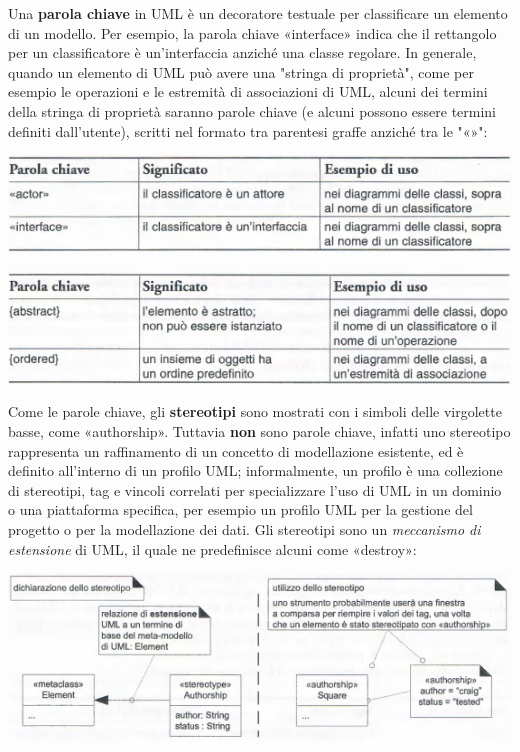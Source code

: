 \documentclass[a4paper,12pt, oneside]{book}
\begin{document}
Una \textbf{parola chiave} in UML è un decoratore testuale per classificare un elemento di un
modello. Per esempio, la parola chiave «interface» indica che il rettangolo per un classificatore è un'interfaccia anziché una classe regolare. In generale, quando un elemento di UML può avere una "stringa di proprietà", come per esempio le operazioni e le estremità di associazioni di UML, alcuni dei termini della stringa di proprietà saranno parole chiave (e alcuni possono essere termini definiti dall'utente), scritti nel formato tra parentesi graffe anziché tra le "«»":
\begin{center}
	\includegraphics[scale=0.6]{img/clasd8.png}
\end{center}
\begin{center}
	\includegraphics[scale=0.6]{img/clasd9.png}
\end{center}
Come le parole chiave, gli \textbf{stereotipi} sono mostrati con i simboli delle virgolette basse, come «authorship». Tuttavia \textbf{non} sono parole chiave, infatti uno stereotipo rappresenta un raffinamento di un concetto di modellazione esistente, ed è definito all'interno di un profilo UML; informalmente, un profilo è una collezione di stereotipi, tag e vincoli correlati per specializzare l'uso di UML in un dominio o una piattaforma specifica, per esempio un profilo UML per la gestione del progetto o per la modellazione dei dati. Gli stereotipi sono un \textit{meccanismo di estensione} di UML, il quale ne predefinisce alcuni come «destroy»:
\begin{center}
	\includegraphics[scale=0.7]{img/clasd10.png}
\end{center}
\end{document}
